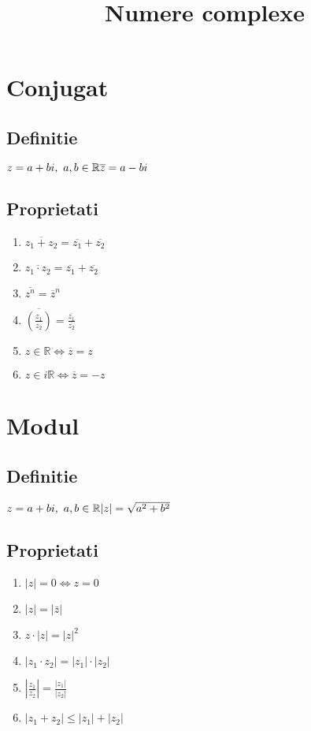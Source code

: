 \documentclass{article}
\title{Numere complexe}
\date{}
\author{}
\begin{document}
\maketitle
\section{Conjugat}

\subsection{Definitie}
$
    z = a+bi,\  a,b \in\mathbb{R}
    \\*
    \overline{z} = a-bi
$

\subsection{Proprietati}
\begin{enumerate}
    \item $ \overline{z_1+z_2} = \overline{z_1} + \overline{z_2}$
    \item $ \overline{z_1\cdot z_2} = \overline{z_1} + \overline{z_2}$
    \item $ \overline{z^n} = \overline{z}^n$
    \item $ \overline{(\frac{z_1}{z_2})} = \frac{\overline{z_1}}{\overline{z_2}}$
    \item $ z \in \mathbb{R} \Leftrightarrow \overline{z}=z$
    \item $ z \in i\mathbb{R} \Leftrightarrow \overline{z}=-z$
\end{enumerate}

\section{Modul}

\subsection{Definitie}
$
    z = a+bi,\  a,b \in \mathbb{R}
    \\*
    |z| = \sqrt{a^2+b^2}
$

\subsection{Proprietati}
\begin{enumerate}
    \item $ |z| = 0 \Leftrightarrow z=0$
    \item $ |z| = |\overline{z}|$
    \item $ z \cdot |z| = |z|^2$
    \item $ |z_1 \cdot z_2| = |z_1| \cdot |z_2|$
    \item $ |\frac{z_1}{z_2}| = \frac{|z_1|}{|z_2|} $
    \item $ |z_1 + z_2| \leq |z_1| + |z_2|$
\end{enumerate}
\end{document}
